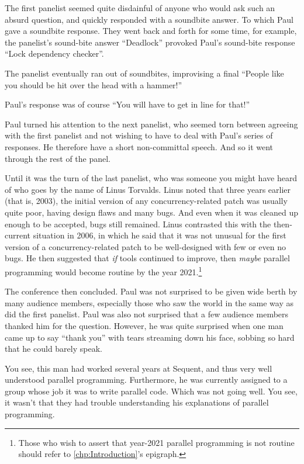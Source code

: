 \fi

The first panelist seemed quite disdainful of anyone who would ask such
an absurd question, and quickly responded with a soundbite answer.
To which Paul gave a soundbite response.
They went back and forth for some time, for example, the panelist's
sound-bite answer ``Deadlock'' provoked Paul's sound-bite response ``Lock
dependency checker''.

The panelist eventually ran out of soundbites, improvising a final
``People like you should be hit over the head with a hammer!''

Paul's response was of course ``You will have to get in line for that!''

Paul turned his attention to the next panelist, who seemed torn between
agreeing with the first panelist and not wishing to have to deal with
Paul's series of responses.
He therefore have a short non-committal speech.
And so it went through the rest of the panel.

Until it was the turn of the last panelist, who was someone you might have
heard of who goes by the name of Linus Torvalds.
Linus noted that three years earlier (that is, 2003), the initial version
of any concurrency-related patch was usually quite poor, having design
flaws and many bugs.
And even when it was cleaned up enough to be accepted, bugs still
remained.
Linus contrasted this with the then-current situation in 2006, in which
he said that it was not unusual for the first version of a concurrency-related
patch to be well-designed with few or even no bugs.
He then suggested that \emph{if} tools continued to improve, then \emph{maybe}
parallel programming would become routine by the year 2021.\footnote{
	Those who wish to assert that year-2021 parallel programming is
	not routine should refer to \cref{chp:Introduction}'s epigraph.}

The conference then concluded.
Paul was not surprised to be given wide berth by many audience members,
especially those who saw the world in the same way as did the first panelist.
Paul was also not surprised that a few audience members thanked him for
the question.
However, he was quite surprised when one man came up to say ``thank
you'' with tears streaming down his face, sobbing so hard that he could
barely speak.

You see, this man had worked several years at Sequent, and thus very
well understood parallel programming.
Furthermore, he was currently assigned to a group whose job it was to
write parallel code.
Which was not going well.
You see, it wasn't that they had trouble understanding his explanations
of parallel programming.

